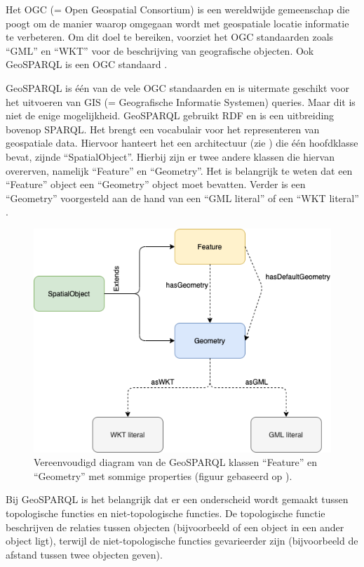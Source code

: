 \documentclass[twocolumn]{phdsymp} %
\begin{document}
Het OGC (= Open Geospatial Consortium) is een wereldwijde gemeenschap die poogt om de manier waarop omgegaan wordt met geospatiale locatie informatie te verbeteren. Om dit doel te bereiken, voorziet het OGC standaarden zoals ``GML'' en ``WKT'' voor de beschrijving van geografische objecten. Ook GeoSPARQL is een OGC standaard \cite{ogcdocs}.

GeoSPARQL is één van de vele OGC standaarden en is uitermate geschikt voor het uitvoeren van GIS (= Geografische Informatie Systemen) queries. Maar dit is niet de enige mogelijkheid. GeoSPARQL gebruikt RDF en is een uitbreiding bovenop SPARQL. Het brengt een vocabulair voor het representeren van geospatiale data. Hiervoor hanteert het een architectuur (zie ) die één hoofdklasse bevat, zijnde ``SpatialObject''. Hierbij zijn er twee andere klassen die hiervan overerven, namelijk ``Feature'' en ``Geometry''. Het is belangrijk te weten dat een ``Feature'' object een ``Geometry'' object moet bevatten. Verder is een ``Geometry'' voorgesteld aan de hand van een ``GML literal'' of een ``WKT literal'' \cite{ogcdocs}.

\begin{figure}[ht]
    \centering
    \includegraphics[width=\linewidth]{images/geosparql_architecture.png}
    \caption{Vereenvoudigd diagram van de GeoSPARQL klassen ``Feature'' en ``Geometry'' met sommige properties (figuur gebaseerd op \protect\cite{geosparqlsupport}).}
    \label{fig:abstr_geosparql_architecture}
\end{figure}

Bij GeoSPARQL is het belangrijk dat er een onderscheid wordt gemaakt tussen topologische functies en niet-topologische functies. De topologische functie beschrijven de relaties tussen objecten (bijvoorbeeld of een object in een ander object ligt), terwijl de niet-topologische functies gevarieerder zijn (bijvoorbeeld de afstand tussen twee objecten geven). 
\end{document}

